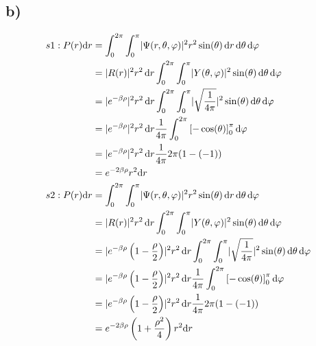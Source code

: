     \subsection{b)}

    \begin{align*}
        s1: P(r)\mathrm{d}r &= \int_{0}^{2\pi} \int_{0}^{\pi} \lvert\Psi(r,\theta,\varphi)\rvert^2 r^2 \sin(\theta)\, \mathrm{d}r\, \mathrm{d}\theta\, \mathrm{d}\varphi\\
        &= \lvert R(r)\rvert^2 r^2 \,\mathrm{d}r \int_{0}^{2\pi} \int_{0}^{\pi} \lvert Y(\theta,\varphi)\rvert^2 \sin(\theta) \, \mathrm{d}\theta\, \mathrm{d}\varphi\\
        &= \lvert e^{-\beta\rho}\rvert^2 r^2 \,\mathrm{d}r \int_{0}^{2\pi} \int_{0}^{\pi} \lvert\sqrt{\frac{1}{4\pi}}\rvert^2 \sin(\theta) \, \mathrm{d}\theta\, \mathrm{d}\varphi\\
        &= \lvert e^{-\beta\rho}\rvert^2 r^2 \,\mathrm{d}r \frac{1}{4\pi} \int_{0}^{2\pi} \left[-\cos(\theta)\right]_0^{\pi} \mathrm{d}\varphi\\
        &= \lvert e^{-\beta\rho}\rvert^2 r^2 \,\mathrm{d}r \frac{1}{4\pi} 2\pi (1-(-1))\\
        &= e^{-2\beta\rho} r^2 \mathrm{d}r\\
        s2: P(r)\mathrm{d}r &= \int_{0}^{2\pi} \int_{0}^{\pi} \lvert\Psi(r,\theta,\varphi)\rvert^2 r^2 \sin(\theta)\, \mathrm{d}r\, \mathrm{d}\theta\, \mathrm{d}\varphi\\
        &= \lvert R(r)\rvert^2 r^2 \,\mathrm{d}r \int_{0}^{2\pi} \int_{0}^{\pi} \lvert Y(\theta,\varphi)\rvert^2 \sin(\theta) \, \mathrm{d}\theta\, \mathrm{d}\varphi\\
        &= \lvert e^{-\beta\rho}\left( 1-\frac{\rho}{2} \right)\rvert^2 r^2 \,\mathrm{d}r \int_{0}^{2\pi} \int_{0}^{\pi} \lvert\sqrt{\frac{1}{4\pi}}\rvert^2 \sin(\theta) \, \mathrm{d}\theta\, \mathrm{d}\varphi\\
        &= \lvert e^{-\beta\rho}\left( 1-\frac{\rho}{2} \right)\rvert^2 r^2 \,\mathrm{d}r \frac{1}{4\pi} \int_{0}^{2\pi} \left[-\cos(\theta)\right]_0^{\pi} \mathrm{d}\varphi\\
        &= \lvert e^{-\beta\rho}\left( 1-\frac{\rho}{2} \right)\rvert^2 r^2 \,\mathrm{d}r \frac{1}{4\pi} 2\pi (1-(-1))\\
        &= e^{-2\beta\rho}\left( 1+\frac{\rho^2}{4} \right) r^2 \mathrm{d}r
    \end{align*}

